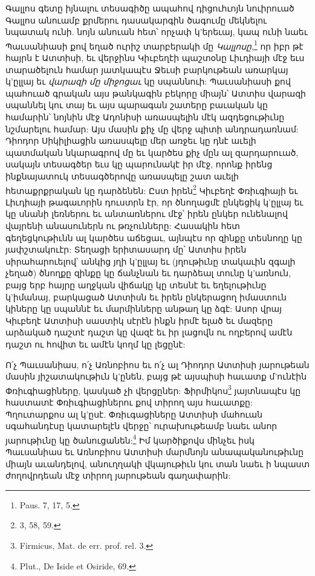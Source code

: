 \documentclass{article}
\begin{document}
{Գալլոս գետը իյնալու տեսագիծը ապահով դիցուհւոյն նուիրուած Գալլոս անուամբ քրմերու դասակարգին ծագումը մեկնելու նպատակ ունի. նոյն անուան հետ՝ որչափ կ'երեւայ, կապ ունի նաեւ Պաւսանիասի քով եղած ուրիշ տարբերակի մը \emph{Կալլոսը},\footnote{Paus. 7, 17, 5.} որ իբր թէ հայրն է Ատտիսի, եւ վերջինս Կիւբեղէի պաշտօնը Լիւդիայի մէջ եւս տարածելուն համար յատկապէս Ջեւսի բարկութեան առարկայ կ'ըլլայ եւ \emph{վարազի մը միջոցաւ} կը սպաննուի: Պաւսանիասի քով պահուած գրական այս թանկագին բեկորը միայն՝ Ատտիս վարազի սպաննել կու տայ եւ այս պարագան շատերը բաւական կը համարին՝ նոյնին մէջ Ադոնիսի առասպելին մէկ ազդեցութիւնը նշմարելու համար: Այս մասին քիչ մը վերջ պիտի անդրադառնամ: Դիոդոր Սիկիլիացին առասպելը մեր առջեւ կը դնէ աւելի պատմական նկարագրով մը եւ կարծես քիչ մըն ալ զարդարուած, սակայն տեսագծեր եւս կը պարունակէ իր մէջ, որոնք իրենց ինքնայատուկ տեսագծերովը առասպելը շատ աւելի հետաքրքրական կը դարձենեն: Ըստ իրեն\footnote{3, 58, 59.} Կիւբեղէ Փռիւգիայի եւ Լիւդիայի թագաւորին դուստրն էր, որ ծնողացմէ ընկեցիկ կ'ըլլայ եւ կը սնանի լեռներու եւ անտառներու մէջ՝ իրեն ընկեր ունենալով վայրենի անասուներն ու թռչունները: Հասակին հետ գեղեցկութիւնն ալ կարծես աճեցաւ, այնպէս որ զինքը տեսնողը կը յափշտակուէր: Տեղացի երիտասարդ մը՝ Ատտիս իրեն սիրահարուելով՝ անկից յղի կ'ըլլայ եւ (յղութիւնը տակաւին զգալի չեղած) ծնողքը զինքը կը ճանչնան եւ դարձեալ տունը կ'առնուն, բայց երբ հայրը աղջկան վիճակը կը տեսնէ եւ եղելութիւնը կ'իմանայ, բարկացած Ատտիսն եւ իրեն ընկերացող իմաստուն կիները կը սպաննէ եւ մարմինները անթաղ կը ձգէ: Ասոր վրայ Կիւբեղէ Ատտիսի սաստիկ սէրէն ինքն իրմէ ելած եւ մազերը արձակած դաշտէ դաշտ կը վազէ եւ իր լացովն ու ողբերով ամէն դաշտ ու հովիտ եւ ամէն կողմ կը լեցընէ:

Ո՛չ Պաւսանիաս, ո՛չ Առնոբիոս եւ ո՛չ ալ Դիոդոր Ատտիսի յարութեան մասին յիշատակութիւն կ'ընեն, բայց թէ այսպիսի հաւատք մ'ունէին Փռիւգիացիները, կասկած չի վերցըներ: Ֆիրմիկոս\footnote{Firmicus, Mat. de err. prof. rel. 3.} յայտնապէս կը հաստատէ Փռիւգիացիներու քով տիրող այս հաւատքը: Պղուտարքոս ալ կ'ըսէ. Փռիւգացիները Ատտիսի մահուան սգահանդէսը կատարելէն վերջը՝ ուրախութեամբ նաեւ անոր յարութիւնը կը ծանուցանեն:\footnote{Plut., De Iside et Osiride, 69.} Իմ կարծիքովս մինչեւ իսկ Պաւսանիաս եւ Առնոբիոս Ատտիսի մարմնոյն անապականութիւնը միայն աւանդելով, անուղղակի վկայութիւն կու տան նաեւ ի նպաստ ժողովրդեան մէջ տիրող յարութեան գաղափարին:

}
\end{document}
